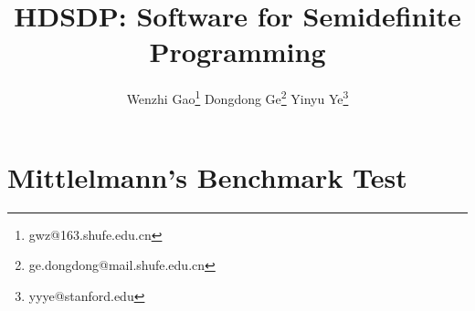 \documentclass[10pt]{article}
\begin{document}
\title{HDSDP: Software for Semidefinite Programming}

\author{Wenzhi Gao\thanks{gwz@163.shufe.edu.cn} \quad Dongdong Ge\thanks{ge.dongdong@mail.shufe.edu.cn} \quad Yinyu Ye\thanks{yyye@stanford.edu}}\maketitle












\newpage
\appendix\section{Mittlelmann's Benchmark Test}


\end{document}
